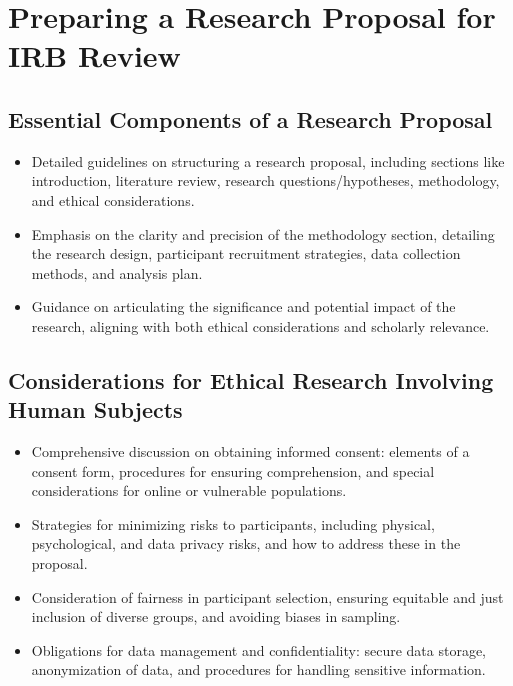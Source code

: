 \documentclass[
]{book}
\begin{document}
\hypertarget{preparing-a-research-proposal-for-irb-review}{%
\section*{Preparing a Research Proposal for IRB Review}\label{preparing-a-research-proposal-for-irb-review}}

\hypertarget{essential-components-of-a-research-proposal}{%
\subsection*{Essential Components of a Research Proposal}\label{essential-components-of-a-research-proposal}}

\begin{itemize}
\item
  Detailed guidelines on structuring a research proposal, including sections like introduction, literature review, research questions/hypotheses, methodology, and ethical considerations.
\item
  Emphasis on the clarity and precision of the methodology section, detailing the research design, participant recruitment strategies, data collection methods, and analysis plan.
\item
  Guidance on articulating the significance and potential impact of the research, aligning with both ethical considerations and scholarly relevance.
\end{itemize}

\hypertarget{considerations-for-ethical-research-involving-human-subjects}{%
\subsection*{Considerations for Ethical Research Involving Human Subjects}\label{considerations-for-ethical-research-involving-human-subjects}}

\begin{itemize}
\item
  Comprehensive discussion on obtaining informed consent: elements of a consent form, procedures for ensuring comprehension, and special considerations for online or vulnerable populations.
\item
  Strategies for minimizing risks to participants, including physical, psychological, and data privacy risks, and how to address these in the proposal.
\item
  Consideration of fairness in participant selection, ensuring equitable and just inclusion of diverse groups, and avoiding biases in sampling.
\item
  Obligations for data management and confidentiality: secure data storage, anonymization of data, and procedures for handling sensitive information.
\end{itemize}
\end{document}

